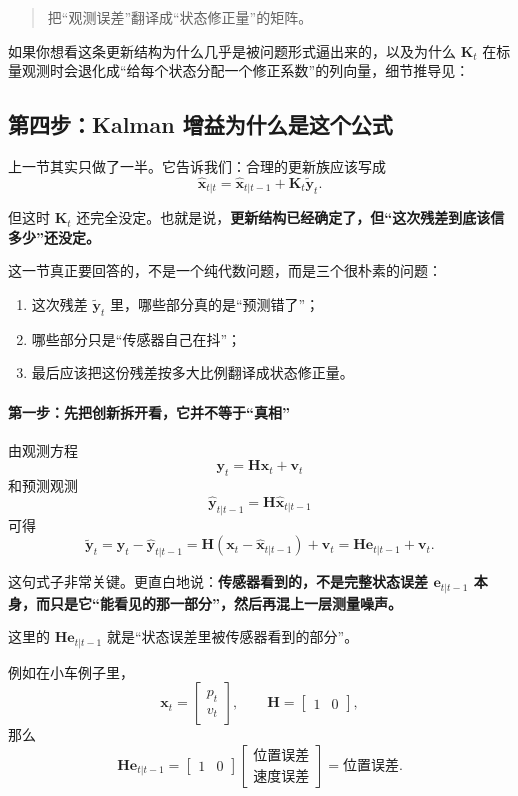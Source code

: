 \documentclass[12pt,a4paper]{ctexart}
\begin{document}
\begin{quote}
把“观测误差”翻译成“状态修正量”的矩阵。
\end{quote}

如果你想看这条更新结构为什么几乎是被问题形式逼出来的，以及为什么
\(\bm{K}_t\)
在标量观测时会退化成“给每个状态分配一个修正系数”的列向量，细节推导见：

\begin{quote}
\end{quote}

\subsection{第四步：Kalman 增益为什么是这个公式}

上一节其实只做了一半。它告诉我们：合理的更新族应该写成
\[
\hat{\bm{x}}_{t|t}
= \hat{\bm{x}}_{t|t-1} + \bm{K}_t\tilde{\bm{y}}_t.
\]

但这时
\(\bm{K}_t\)
还完全没定。也就是说，\textbf{更新结构已经确定了，但“这次残差到底该信多少”还没定。}

这一节真正要回答的，不是一个纯代数问题，而是三个很朴素的问题：
\begin{enumerate}
  \item 这次残差
  \(\tilde{\bm{y}}_t\)
  里，哪些部分真的是“预测错了”；
  \item 哪些部分只是“传感器自己在抖”；
  \item 最后应该把这份残差按多大比例翻译成状态修正量。
\end{enumerate}

\paragraph{第一步：先把创新拆开看，它并不等于“真相”}

由观测方程
\[
\bm{y}_t = \bm{H}\bm{x}_t + \bm{v}_t
\]
和预测观测
\[
\hat{\bm{y}}_{t|t-1} = \bm{H}\hat{\bm{x}}_{t|t-1}
\]
可得
\[
\tilde{\bm{y}}_t
= \bm{y}_t - \hat{\bm{y}}_{t|t-1}
= \bm{H}(\bm{x}_t-\hat{\bm{x}}_{t|t-1}) + \bm{v}_t
= \bm{H}\bm{e}_{t|t-1} + \bm{v}_t.
\]

这句式子非常关键。更直白地说：\textbf{传感器看到的，不是完整状态误差
\(\bm{e}_{t|t-1}\)
本身，而只是它“能看见的那一部分”，然后再混上一层测量噪声。}

这里的
\(\bm{H}\bm{e}_{t|t-1}\)
就是“状态误差里被传感器看到的部分”。

例如在小车例子里，
\[
\bm{x}_t =
\begin{bmatrix}
p_t\\
v_t
\end{bmatrix},
\qquad
\bm{H} =
\begin{bmatrix}
1 & 0
\end{bmatrix},
\]
那么
\[
\bm{H}\bm{e}_{t|t-1}
=
\begin{bmatrix}
1 & 0
\end{bmatrix}
\begin{bmatrix}
\text{位置误差}\\
\text{速度误差}
\end{bmatrix}
= \text{位置误差}.
\]
\end{document}
